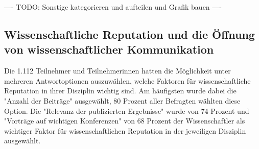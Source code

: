 ---- TODO: Sonstige kategorieren und aufteilen und Grafik bauen ----

\subsection{Wissenschaftliche Reputation und die Öffnung von wissenschaftlicher Kommunikation}

Die 1.112 Teilnehmer und Teilnehmerinnen hatten die Möglichkeit unter mehreren Antwortoptionen auszuwählen, welche Faktoren für wissenschaftliche Reputation in ihrer Disziplin wichtig sind. Am häufigsten wurde dabei die "Anzahl der Beiträge" ausgewählt, 80 Prozent aller Befragten wählten diese Option. Die "Relevanz der publizierten Ergebnisse" wurde von 74 Prozent und "Vorträge auf wichtigen Konferenzen" von 68 Prozent der Wissenschaftler als wichtiger Faktor für wissenschaftlichen Reputation in der jeweiligen Disziplin ausgewählt.

